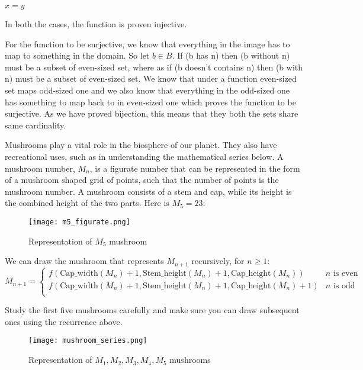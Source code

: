 \documentclass[addpoints]{exam}
\begin{document}
\begin{questions}
\begin{solution}
$x=y$ 

In both the cases, the function is proven injective. 

For the function to be surjective, we know that everything in the image has to map to something in the domain. So let $b \in B$. If (b has n) then (b without n) must be a subset of even-sized set, where as if (b doesn't contains n) then (b with n) must be a subset of even-sized set. We know that under a function even-sized set maps odd-sized one  and we also know that everything in the odd-sized one has something  to map back to in even-sized one which proves the function to be surjective. As we have proved bijection, this means that they both the sets share same cardinality. 

  \end{solution}
  
\question Mushrooms play a vital role in the biosphere of our planet. They also have recreational uses, such as in understanding the mathematical series below. A mushroom number, $M_n$, is a figurate number that can be represented in the form of a mushroom shaped grid of points, such that the number of points is the mushroom number. A mushroom consists of a stem and cap, while its height is the combined height of the two parts. Here is $M_5=23$:

\begin{figure}[h]
  \centering
  \texttt{[image: m5\_figurate.png]}
  \caption{Representation of $M_5$ mushroom}
  \label{fig:mushroom_anatomy}
\end{figure}

We can draw the mushroom that represents $M_{n+1}$ recursively, for $n \geq 1$:
\[ 
    M_{n+1}=
    \begin{cases} 
      f(\textrm{Cap\_width}(M_n) + 1, \textrm{Stem\_height}(M_n) + 1, \textrm{Cap\_height}(M_n))  & n \textrm{ is even} \\
      f(\textrm{Cap\_width}(M_n) + 1, \textrm{Stem\_height}(M_n) + 1, \textrm{Cap\_height}(M_n)+1) & n \textrm{ is odd}  \\      
   \end{cases}
\]

Study the first five mushrooms carefully and make sure you can draw subsequent ones using the recurrence above.

\begin{figure}[h]
  \centering
  \texttt{[image: mushroom\_series.png]}
  \caption{Representation of $M_1,M_2,M_3,M_4,M_5$ mushrooms}
  \label{fig:mushroom_anatomy}
\end{figure}


\end{questions}
\end{document}
